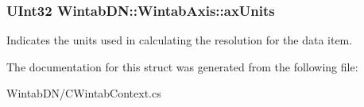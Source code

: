 \hypertarget{struct_wintab_d_n_1_1_wintab_axis_a778377ddf52f8dc0aa483e6f942aeebc}{
\subsubsection[{axUnits}]{\setlength{\rightskip}{0pt plus 5cm}UInt32 {\bf WintabDN::WintabAxis::axUnits}}}
\label{struct_wintab_d_n_1_1_wintab_axis_a778377ddf52f8dc0aa483e6f942aeebc}


Indicates the units used in calculating the resolution for the data item. 



The documentation for this struct was generated from the following file:\begin{DoxyCompactItemize}
\item 
WintabDN/CWintabContext.cs\end{DoxyCompactItemize}
